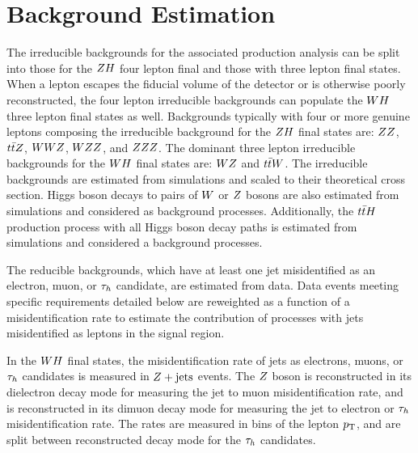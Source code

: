 \section{Background Estimation}
\label{sec:vh_background_estimation}

The irreducible backgrounds for the associated production analysis can
be split into those for the $ZH$ four lepton final and those
with three lepton final states. When a lepton escapes the fiducial
volume of the detector or is otherwise poorly reconstructed, the four
lepton irreducible backgrounds can populate the $WH$ three
lepton final states as well.
Backgrounds typically with four or more genuine leptons composing
the irreducible background for the $ZH$ final states are: $ZZ$, 
$t\bar{t}Z$, $WWZ$, $WZZ$, and $ZZZ$. The dominant
three lepton irreducible backgrounds for the $WH$ final states are:
$WZ$ and $t\bar{t}W$. The irreducible backgrounds are 
estimated from simulations and scaled to their theoretical cross section. Higgs 
boson decays to pairs of $W$ or $Z$ bosons 
are also estimated from simulations and considered as background processes. 
Additionally, the $t\bar{t}H$ production process with all Higgs boson decay
paths is estimated from simulations and considered a background processes.

The reducible backgrounds, which have at least one jet misidentified as an electron, 
muon, or $\tau_{h}$ candidate, are estimated from data. 
Data events meeting specific requirements detailed below are reweighted 
as a function of a misidentification rate to estimate the 
contribution of processes with jets misidentified as leptons in the signal region. 

In the $WH$ final states, the misidentification rate of jets as electrons, muons, 
or $\tau_{h}$ candidates is measured in $Z+\textrm{jets}$ events. The $Z$ boson is reconstructed 
in its dielectron decay mode for measuring the jet to muon  misidentification
rate, and is reconstructed in its dimuon decay mode for measuring the jet to electron
or $\tau_{h}$ misidentification rate.
The rates are measured in bins of the lepton $p_\mathrm{T}$, and are 
split between reconstructed decay mode for the $\tau_{h}$ candidates. 


